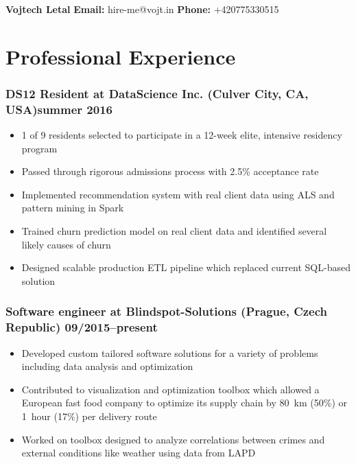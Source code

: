 \documentclass[10pt]{article}
\date{}
\begin{document}
\clearpage
\thispagestyle{empty}
{\center\bfseries\huge Vojtech Letal}
\hfill
{\bf Email:} hire-me@vojt.in
{\bf Phone:} +420775330515


\section*{Professional Experience}
\subsubsection*{\bf DS12 Resident at DataScience Inc. (Culver City, CA, USA)\hfill summer 2016}
	 \begin{itemize}
		\setlength\itemsep{-0.25em}
		\item 1 of 9 residents selected to participate in a 12-week elite, intensive residency program
		\item Passed through rigorous admissions process with 2.5\% acceptance rate
		\item Implemented recommendation system with real client data using ALS and pattern mining in Spark
		\item Trained churn prediction model on real client data and identified several likely causes of churn
		\item Designed scalable production ETL pipeline which replaced current SQL-based solution
	 \end{itemize}

\subsubsection*{\bf Software engineer at Blindspot-Solutions (Prague, Czech Republic) \hfill 09/2015--present}
	 \begin{itemize}
		\setlength\itemsep{-0.25em}
		\item Developed custom tailored software solutions for a variety of problems including data analysis and optimization
		\item Contributed to visualization and optimization toolbox which allowed a European fast food company to optimize its supply chain by 80~km (50\%) or 1~hour (17\%) per delivery route
		\item Worked on toolbox designed to analyze correlations between crimes and external conditions like weather using data from LAPD
	 \end{itemize}
\end{document}
